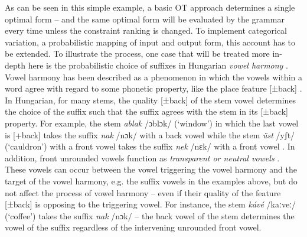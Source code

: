 \largerpage
As can be seen in this simple example, a basic OT approach determines a single optimal form – and the same optimal form will be evaluated by the grammar every time unless the constraint ranking is changed. To implement categorical variation, a probabilistic mapping of input and output form, this account has to be extended. To illustrate the process, one case that will be treated more in-depth here is the probabilistic choice of suffixes in Hungarian \emph{vowel harmony} \citep{HayesLonde2006}. Vowel harmony has been described as a phenomenon in which the vowels within a word agree with regard to some phonetic property, like the place feature [±back] \citep{GafosBenus2006}. In Hungarian, for many stems, the quality  [±back] of the stem vowel determines the choice of the suffix such that the suffix agrees with the stem in its [±back] property. For example, the stem \emph{ablak} /ɔblɔk/ (`window') in which the last vowel is [+back] takes the suffix \emph{nak} /nɔk/ with a back vowel while the stem \emph{üst} /yʃt/ (`cauldron') with a front vowel takes the suffix \emph{nek} /nɛk/ with a front vowel \citep[62]{HayesLonde2006}. In addition, front unrounded vowels function as \emph{transparent or neutral vowels} \citep{HayesLonde2006}. These vowels can occur between the vowel triggering the vowel harmony and the target of the vowel harmony, e.g. the suffix vowels in the examples above, but do not affect the process of vowel harmony – even if their quality of the feature [±back] is opposing to the triggering vowel. For instance, the stem \emph{kávé} /kaːveː/ (`coffee') takes the suffix \emph{nak} /nɔk/ – the back vowel of the stem determines the vowel of the suffix regardless of the intervening unrounded front vowel. 

